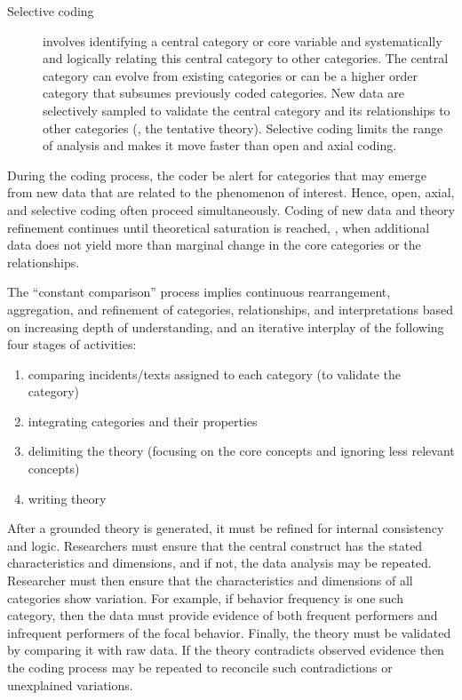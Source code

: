 \begin{description}
\item[Selective coding] involves identifying a central category or core variable and systematically and logically relating this central category to other categories. The central category can evolve from existing categories or can be a higher order category that subsumes previously coded categories. New data are selectively sampled to validate the central category and its relationships to other categories (\ie, the tentative theory). Selective coding limits the range of analysis and makes it move faster than open and axial coding.

\end{description}

During the coding process, the coder be alert for categories that may emerge from new data that are related to the phenomenon of interest. Hence, open, axial, and selective coding often proceed simultaneously. Coding of new data and theory refinement continues until theoretical saturation is reached, \ie, when additional data does not yield more than marginal change in the core categories or the relationships.

The ``constant comparison'' process implies continuous rearrangement, aggregation, and refinement of categories, relationships, and interpretations based on increasing depth of understanding, and an iterative interplay of the following four stages of activities:

\begin{enumerate}
	\item comparing incidents/texts assigned to each category (to validate the category)
	\item integrating categories and their properties
	\item delimiting the theory (focusing on the core concepts and ignoring less relevant concepts)
	\item writing theory
\end{enumerate}

After a grounded theory is generated, it must be refined for internal consistency and logic. Researchers must ensure that the central construct has the stated characteristics and dimensions, and if not, the data analysis may be repeated. Researcher must then ensure that the characteristics and dimensions of all categories show variation. For example, if behavior frequency is one such category, then the data must provide evidence of both frequent performers and infrequent performers of the focal behavior. Finally, the theory must be validated by comparing it with raw data. If the theory contradicts observed evidence then the coding process may be repeated to reconcile such contradictions or unexplained variations. 

